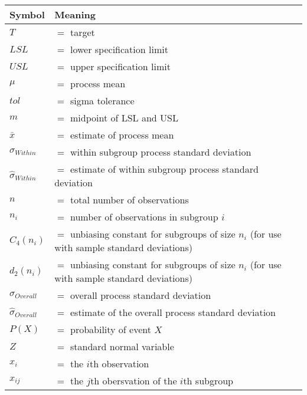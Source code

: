 \documentclass[11pt]{article}
\begin{document}
\begin{center}
\begin{tabular}{l l l}
  \toprule
  \textbf{Symbol}  & \textbf{Meaning} \\
  \midrule
  \( T \)                         & \(=\) target \\
  \( LSL \)                       & \(=\) lower specification limit \\
  \( USL \)                       & \(=\) upper specification limit \\
  \( \mu \)                       & \(=\) process mean \\
  \( tol \)                       & \(=\) sigma tolerance \\
  \( m \)                         & \(=\) midpoint of LSL and USL \\
  \( \bar x \)                    & \(=\) estimate of process mean \\
  \( \sigma_{Within} \)           & \(=\) within subgroup process standard deviation \\
  \( \hat \sigma_{Within} \)      & \(=\) estimate of within subgroup process standard deviation \\
  \( n \)                         & \(=\) total number of observations \\
  \( n_i \)                       & \(=\) number of observations in subgroup \(i\) \\
  \( C_4(n_i) \)                  & \(=\) unbiasing constant for subgroups of size \(n_i\) (for use with sample standard deviations)\\
  \( d_2(n_i) \)                  & \(=\) unbiasing constant for subgroups of size \(n_i\) (for use with sample standard deviations)\\
  \( \sigma_{Overall} \)          & \(=\) overall process standard deviation \\
  \( \hat \sigma_{Overall} \)     & \(=\) estimate of the overall process standard deviation \\
  \( P(X) \)                      & \(=\) probability of event \(X\) \\
  \( Z \)                         & \(=\) standard normal variable \\
  \( x_i \)                       & \(=\) the \(i\)th observation \\
  \( x_{ij} \)                    & \(=\) the \(j\)th obersvation of the \(i\)th subgroup \\
  \bottomrule
\end{tabular}
\end{center}
\end{document}
